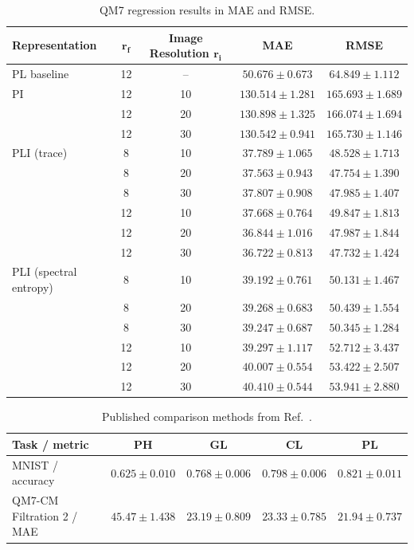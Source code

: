 \documentclass{article}
\begin{document}
\begin{table}[t]
\centering
\caption{
QM7 regression results in MAE and RMSE.}
\label{tab:persistent_laplacian_metrics}
\small
\setlength{\tabcolsep}{3.5pt}
\begin{tabular}{@{}lcccc@{}}
\toprule
\textbf{Representation} &
\(\boldsymbol{r_f}\) &\textbf{Image Resolution}
\(\boldsymbol{r_i}\) &
\textbf{MAE}  &
\textbf{RMSE}\\
\midrule
PL baseline
 & 12 & -- & \(50.676 \pm 0.673\) & \(64.849 \pm 1.112\) \\
\midrule
PI
 & 12 & 10 & \(130.514 \pm 1.281\) & \(165.693 \pm 1.689\) \\
 & 12 & 20 & \(130.898 \pm 1.325\) & \(166.074 \pm 1.694\) \\
 & 12 & 30 & \(130.542 \pm 0.941\) & \(165.730 \pm 1.146\) \\
\midrule
PLI (trace)
 &  8 & 10 & \(37.789 \pm 1.065\) & \(48.528 \pm 1.713\) \\
 &  8 & 20 & \(37.563 \pm 0.943\) & \(47.754 \pm 1.390\) \\
 &  8 & 30 & \(37.807 \pm 0.908\) & \(47.985 \pm 1.407\) \\
 & 12 & 10 & \(37.668 \pm 0.764\) & \(49.847 \pm 1.813\) \\
 & 12 & 20 & \(36.844 \pm 1.016\) & \(47.987 \pm 1.844\) \\
 & 12 & 30 &
   \(\mathbf{36.722 \pm 0.813}\) &
   \(\mathbf{47.732 \pm 1.424}\) \\
\midrule
PLI (spectral entropy)
 &  8 & 10 & \(39.192 \pm 0.761\) & \(50.131 \pm 1.467\) \\
 &  8 & 20 & \(39.268 \pm 0.683\) & \(50.439 \pm 1.554\) \\
 &  8 & 30 & \(39.247 \pm 0.687\) & \(50.345 \pm 1.284\) \\
 & 12 & 10 & \(39.297 \pm 1.117\) & \(52.712 \pm 3.437\) \\
 & 12 & 20 & \(40.007 \pm 0.554\) & \(53.422 \pm 2.507\) \\
 & 12 & 30 & \(40.410 \pm 0.544\) & \(53.941 \pm 2.880\) \\
\bottomrule
\end{tabular}
\end{table}

\begin{table}[t]
\centering
\small
\caption{Published comparison methods from Ref.~\cite{davies2023persistent}.}
\label{tab:davies_published}
\begin{tabular}{lcccc}
\toprule
\textbf{Task / metric} & \textbf{PH} & \textbf{GL} & \textbf{CL} & \textbf{PL} \\
\midrule
MNIST / accuracy & $0.625\pm0.010$ & $0.768\pm0.006$ & $0.798\pm0.006$ & $0.821\pm0.011$ \\
QM7-CM Filtration 2 / MAE & $45.47\pm1.438$ & $23.19\pm0.809$ & $23.33\pm0.785$ & $21.94\pm0.737$ \\
\bottomrule
\end{tabular}
\end{table}
\end{document}
